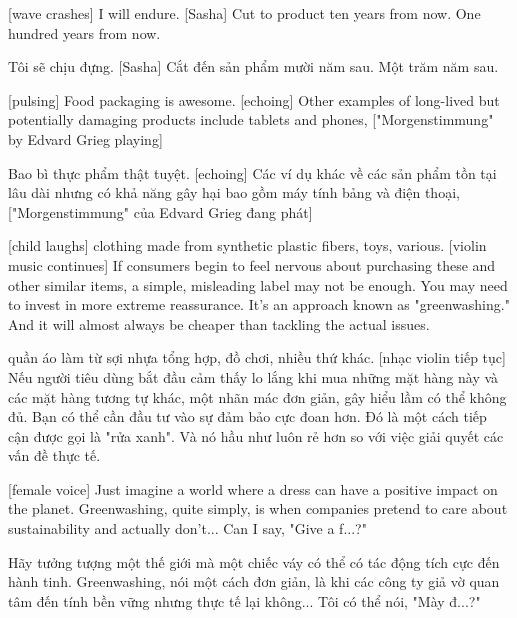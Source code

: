 \documentclass[a4paper]{article}
\begin{document}
	[wave crashes]
	I will endure.
	[Sasha] Cut to product ten years from now.
	One hundred years from now.
	
	\begin{vietnamese-v2}
		[sóng vỗ]
		Tôi sẽ chịu đựng.
		[Sasha] Cắt đến sản phẩm mười năm sau.
		Một trăm năm sau.
	\end{vietnamese-v2}
	
	[pulsing]
	Food packaging is awesome. [echoing]
	Other examples of long-lived but potentially damaging products include tablets and phones, ["Morgenstimmung" by Edvard Grieg playing]
	
	\begin{vietnamese-v2}
		[pulsing]
		Bao bì thực phẩm thật tuyệt. [echoing]
		Các ví dụ khác về các sản phẩm tồn tại lâu dài nhưng có khả năng gây hại bao gồm máy tính bảng và điện thoại, ["Morgenstimmung" của Edvard Grieg đang phát]
	\end{vietnamese-v2}
	
	[child laughs]
	clothing made from synthetic plastic fibers,
	toys, various.
	[violin music continues]
	If consumers begin to feel nervous about purchasing these and other similar items, a simple, misleading label may not be enough.
	You may need to invest in more extreme reassurance.
	It's an approach known as "greenwashing."
	And it will almost always be cheaper than tackling the actual issues.
	
	\begin{vietnamese-v2}
		quần áo làm từ sợi nhựa tổng hợp,
		đồ chơi, nhiều thứ khác.
		[nhạc violin tiếp tục]
		Nếu người tiêu dùng bắt đầu cảm thấy lo lắng khi mua những mặt hàng này và các mặt hàng tương tự khác, một nhãn mác đơn giản, gây hiểu lầm có thể không đủ.
		Bạn có thể cần đầu tư vào sự đảm bảo cực đoan hơn.
		Đó là một cách tiếp cận được gọi là "rửa xanh".
		Và nó hầu như luôn rẻ hơn so với việc giải quyết các vấn đề thực tế.
	\end{vietnamese-v2}
	
	[female voice] Just imagine a world where a dress can have a positive impact on the planet.
	Greenwashing, quite simply, is when companies pretend to care about sustainability and actually don't... Can I say, "Give a f...?"
	
	\begin{vietnamese-v2}
		[giọng nữ] Hãy tưởng tượng một thế giới mà một chiếc váy có thể có tác động tích cực đến hành tinh.
		Greenwashing, nói một cách đơn giản, là khi các công ty giả vờ quan tâm đến tính bền vững nhưng thực tế lại không... Tôi có thể nói, "Mày đ...?"
	\end{vietnamese-v2}
	
\end{document}
